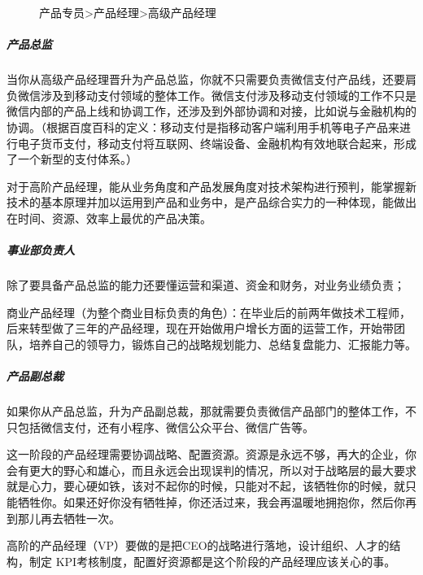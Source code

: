 \documentclass[letterpaper,10pt,english]{sphinxmanual}
\begin{document}
\begin{figure}[H]
\centering
\capstart

\noindent{}
\caption{产品专员\sphinxhyphen{}>产品经理\sphinxhyphen{}>高级产品经理}\label{\detokenize{chapter_introduction/career_path:id30}}\end{figure}


\subparagraph{产品总监}
\label{\detokenize{chapter_introduction/career_path:id13}}
当你从高级产品经理晋升为产品总监，你就不只需要负责微信支付产品线，还要肩负微信涉及到移动支付领域的整体工作。微信支付涉及移动支付领域的工作不只是微信内部的产品上线和协调工作，还涉及到外部协调和对接，比如说与金融机构的协调。（根据百度百科的定义：移动支付是指移动客户端利用手机等电子产品来进行电子货币支付，移动支付将互联网、终端设备、金融机构有效地联合起来，形成了一个新型的支付体系。）

对于高阶产品经理，能从业务角度和产品发展角度对技术架构进行预判，能掌握新技术的基本原理并加以运用到产品和业务中，是产品综合实力的一种体现，能做出在时间、资源、效率上最优的产品决策。


\subparagraph{事业部负责人}
\label{\detokenize{chapter_introduction/career_path:id14}}
除了要具备产品总监的能力还要懂运营和渠道、资金和财务，对业务业绩负责；

商业产品经理（为整个商业目标负责的角色）：在毕业后的前两年做技术工程师，后来转型做了三年的产品经理，现在开始做用户增长方面的运营工作，开始带团队，培养自己的领导力，锻炼自己的战略规划能力、总结复盘能力、汇报能力等。%
\begin{footnote}[357]\sphinxAtStartFootnote
{}
%
\end{footnote}


\subparagraph{产品副总裁}
\label{\detokenize{chapter_introduction/career_path:id15}}
如果你从产品总监，升为产品副总裁，那就需要负责微信产品部门的整体工作，不只包括微信支付，还有小程序、微信公众平台、微信广告等。

这一阶段的产品经理需要协调战略、配置资源。资源是永远不够，再大的企业，你会有更大的野心和雄心，而且永远会出现误判的情况，所以对于战略层的最大要求就是心力，要心硬如铁，该对不起你的时候，只能对不起，该牺牲你的时候，就只能牺牲你。如果还好你没有牺牲掉，你还活过来，我会再温暖地拥抱你，然后你再到那儿再去牺牲一次。

高阶的产品经理（VP）要做的是把CEO的战略进行落地，设计组织、人才的结构，制定
KPI考核制度，配置好资源都是这个阶段的产品经理应该关心的事。%
\begin{footnote}[358]\sphinxAtStartFootnote
{}
%
\end{footnote}
\end{document}

